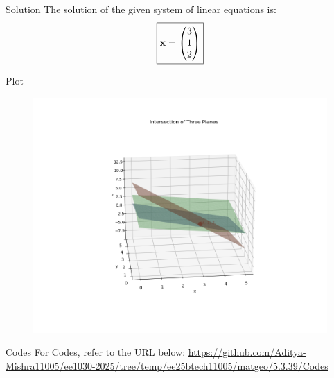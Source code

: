 \documentclass{beamer}
\begin{document}
\begin{frame}{Solution}
	The solution of the given system of linear equations is:
\[
\boxed{
\mathbf{x} = \begin{pmatrix}3 \\ 1 \\ 2\end{pmatrix}
}
\]
\end{frame}
\begin{frame}{Plot}
\begin{figure}
    \centering
    \includegraphics[width=0.8\columnwidth]{Figs/Figure_1.png}
\end{figure}
\end{frame}
\begin{frame}{Codes}
\centering
For Codes, refer to the URL below:  
\url{https://github.com/Aditya-Mishra11005/ee1030-2025/tree/temp/ee25btech11005/matgeo/5.3.39/Codes}
\end{frame}
\end{document}
